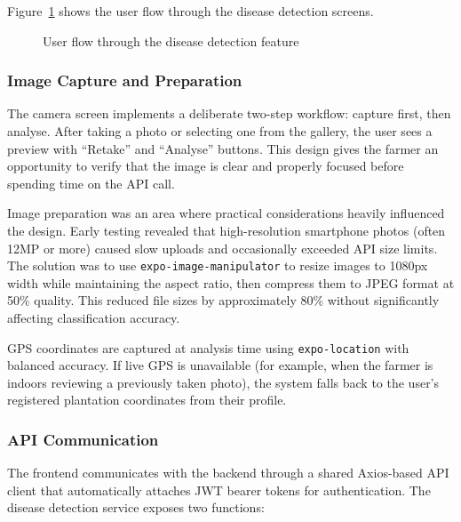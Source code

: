 Figure~\ref{fig:disease_flow} shows the user flow through the disease detection screens.

\begin{figure}[H]
    \centering
    \caption{User flow through the disease detection feature}
    \label{fig:disease_flow}
\end{figure}

\subsubsection{Image Capture and Preparation}

The camera screen implements a deliberate two-step workflow: capture first, then analyse. After taking a photo or selecting one from the gallery, the user sees a preview with ``Retake'' and ``Analyse'' buttons. This design gives the farmer an opportunity to verify that the image is clear and properly focused before spending time on the API call.

Image preparation was an area where practical considerations heavily influenced the design. Early testing revealed that high-resolution smartphone photos (often 12MP or more) caused slow uploads and occasionally exceeded API size limits. The solution was to use \texttt{expo-image-manipulator} to resize images to 1080px width while maintaining the aspect ratio, then compress them to JPEG format at 50\% quality. This reduced file sizes by approximately 80\% without significantly affecting classification accuracy.

GPS coordinates are captured at analysis time using \texttt{expo-location} with balanced accuracy. If live GPS is unavailable (for example, when the farmer is indoors reviewing a previously taken photo), the system falls back to the user's registered plantation coordinates from their profile.

\subsubsection{API Communication}

The frontend communicates with the backend through a shared Axios-based API client that automatically attaches JWT bearer tokens for authentication. The disease detection service exposes two functions:

